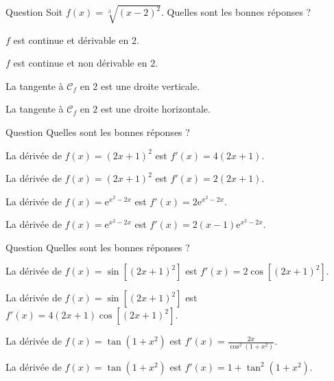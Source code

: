 \begin{multi}{Question}
Soit \(\displaystyle f(x)=\sqrt[3]{(x-2)^2}\). Quelles sont les bonnes réponses ?

    \item \(f\) est continue et dérivable en \(2\).
    \item* \(f\) est continue et non dérivable en \(2\).
    \item* La tangente à \(\mathcal{C}_f\) en \(2\) est une droite verticale.
    \item La tangente à \(\mathcal{C}_f\) en \(2\) est une droite horizontale.
\end{multi}


\begin{multi}[multiple,feedback=
{De manière plus générale, \((u^n)'=nu^{n-1}u'\) et \((\mathrm{e}^v)'=v'\mathrm{e}^v\). Il suffit de prendre \(u=2x+1\), \(n=2\) et \(v=x^2-2x\).
}]{Question}
Quelles sont les bonnes réponses ?

    \item* La dérivée de \(f(x)=(2x+1)^2\) est \(f'(x)=4(2x+1)\).
    \item La dérivée de \(f(x)=(2x+1)^2\) est \(f'(x)=2(2x+1)\).
    \item La dérivée de \(f(x)=\mathrm{e}^{x^2-2x}\) est \(f'(x)=2\mathrm{e}^{x^2-2x}\).
    \item* La dérivée de \(f(x)=\mathrm{e}^{x^2-2x}\) est \(f'(x)=2(x-1)\mathrm{e}^{x^2-2x}\).
\end{multi}


\begin{multi}[multiple,feedback=
{De manière plus générale, \((\sin u)'=u'\cos u\) et 
\[(\tan v)'=\frac{v'}{\cos ^2v}=v'(1+\tan ^2v).\]
Il suffit de prendre \(u=(2x+1)^2\), \(v=1+x^2\Rightarrow u'=4(2x+1)\) et \(v'=2x\).
}]{Question}
Quelles sont les bonnes réponses ?

    \item La dérivée de \(f(x)=\sin [(2x+1)^2]\) est \(f'(x)=2\cos [(2x+1)^2]\).
    \item* La dérivée de \(f(x)=\sin [(2x+1)^2]\) est \(f'(x)=4(2x+1)\cos [(2x+1)^2]\).
    \item* La dérivée de \(f(x)=\tan (1+x^2)\) est \(\displaystyle f'(x)=\frac{2x}{\cos ^2(1+x^2)}\).
    \item La dérivée de \(f(x)=\tan (1+x^2)\) est \(\displaystyle f'(x)=1+\tan ^2(1+x^2)\).
\end{multi}


